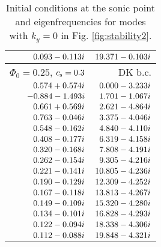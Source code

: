 \documentclass[useAMS,usenatbib]{mn2e}
\begin{document}
\begin {table}
\begin{center}
\begin{tabular}{r r}
    $ 0.093  - 0.113i$	&  $19.371  - 0.103i$ \\
    \hline
    $\Phi_0=0.25$, $c_{\rm s}=0.3$ &  DK b.c. \\
    \hline
   $0.574  + 0.574i$	&  $0.000  - 3.233 i $\\
    $-0.884  - 1.493i$	&  $1.701  - 1.067 i $\\
    $0.661  + 0.569i$ 	&  $2.621  - 4.864 i $\\
    $0.763  - 0.046i$ 	&  $3.375  - 4.046 i $\\
    $0.548  - 0.162i$ 	&  $4.840  - 4.110 i $\\
    $0.408  - 0.177i$ 	&  $6.319  - 4.158 i $\\
    $0.320  - 0.168i$ 	&  $7.808  - 4.191 i $\\
    $0.262  - 0.154i$ 	&  $9.305  - 4.216 i $\\
    $0.221  - 0.141i$ 	&  $10.805  - 4.236 i $\\
    $0.190  - 0.129i$ 	&  $12.309  - 4.252 i $\\
    $0.167  - 0.118i$ 	&  $13.813  - 4.267 i $\\
    $0.149  - 0.109i$ 	&  $15.320  - 4.280 i $\\
    $0.134  - 0.101i$ 	&  $16.828  - 4.293 i $\\
    $0.122  - 0.094i$ 	&  $18.338  - 4.306 i $\\
    $0.112  - 0.088i$ 	&  $19.848  - 4.321 i $\\
    \hline
    \end{tabular}
\caption{Initial conditions at the sonic point and eigenfrequencies for modes with $k_y=0$ in Fig. \ref{fig:stability2}. \label{tab:2}}
\end{center}
\end{table}
\end{document}
